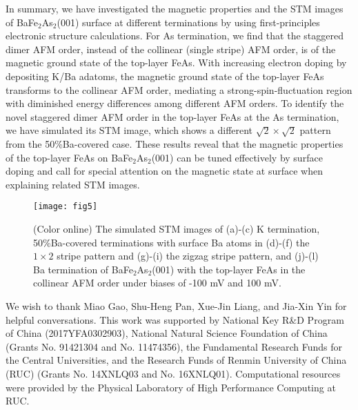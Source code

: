 \documentclass[twocolumn,aps,showpacs,prb]{revtex4-1}
\begin{document}
In summary, we have investigated the magnetic properties and the STM images of BaFe$_{2}$As$_{2}$(001) surface at different terminations by using first-principles electronic structure calculations. For As termination, we find that the staggered dimer AFM order, instead of the collinear (single stripe) AFM order, is of the magnetic ground state of the top-layer FeAs. With increasing electron doping by depositing K/Ba adatoms, the magnetic ground state of the top-layer FeAs transforms to the collinear AFM order, mediating a strong-spin-fluctuation region with diminished energy differences among different AFM orders.
To identify the novel staggered dimer AFM order in the top-layer FeAs at the As termination, we have simulated its STM image, which shows a different $\sqrt{2}\times\sqrt{2}$ pattern from the 50\%Ba-covered case. These results reveal that the magnetic properties of the top-layer FeAs on BaFe$_{2}$As$_{2}$(001) can be tuned effectively by surface doping and call for special attention on the magnetic state at surface when explaining related STM images.

\begin{figure*}[!ht]
\texttt{[image: fig5]}
\caption{(Color online) The simulated STM images of (a)-(c) K termination, 50\%Ba-covered terminations with surface Ba atoms in (d)-(f) the $1\times2$ stripe pattern and (g)-(i) the zigzag stripe pattern, and (j)-(l) Ba termination of BaFe$_{2}$As$_{2}$(001) with the top-layer FeAs in the collinear AFM order under biases of -100 mV and 100 mV.}
\label{fig5}
\end{figure*}

\begin{acknowledgments}

We wish to thank Miao Gao, Shu-Heng Pan, Xue-Jin Liang, and Jia-Xin Yin for helpful conversations. This work was supported by National Key R\&D Program of China (2017YFA0302903), National Natural Science Foundation of China (Grants No. 91421304 and No. 11474356), the Fundamental Research Funds for the Central Universities, and the Research Funds of Renmin University of China (RUC) (Grants No. 14XNLQ03 and No. 16XNLQ01). Computational resources were provided by the Physical Laboratory of High Performance Computing at RUC.

\end{acknowledgments}
\end{document}
